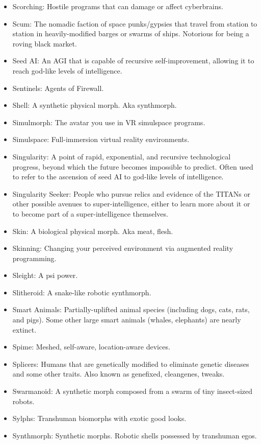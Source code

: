\begin{itemize}
\item Scorching: Hostile programs that can damage or affect  cyberbrains.
\item Scum: The nomadic faction of space punks/gypsies that travel  from station to station in heavily-modified barges or swarms of  ships. Notorious for being a roving black market.
\item Seed AI: An AGI that is capable of recursive self-improvement,  allowing it to reach god-like levels of intelligence.
\item Sentinels: Agents of Firewall.
\item Shell: A synthetic physical morph. Aka synthmorph.
\item Simulmorph: The avatar you use in VR simulspace programs.
\item Simulspace: Full-immersion virtual reality environments.
\item Singularity: A point of rapid, exponential, and recursive  technological progress, beyond which the future becomes impossible  to predict. Often used to refer to the ascension of seed AI to  god-like levels of intelligence.
\item Singularity Seeker: People who pursue relics and evidence of the  TITANs or other possible avenues to super-intelligence, either to  learn more about it or to become part of a super-intelligence  themselves.
\item Skin: A biological physical morph. Aka meat, flesh.
\item Skinning: Changing your perceived environment via augmented  reality programming.
\item Sleight: A psi power.
\item Slitheroid: A snake-like robotic synthmorph.
\item Smart Animals: Partially-uplifted animal species (including  dogs, cats, rats, and pigs). Some other large smart animals (whales,  elephants) are nearly extinct.
\item Spime: Meshed, self-aware, location-aware devices.
\item Splicers: Humans that are genetically modified to eliminate  genetic diseases and some other traits. Also known as genefixed,  cleangenes, tweaks.
\item Swarmanoid: A synthetic morph composed from a swarm of tiny  insect-sized robots.
\item Sylphs: Transhuman biomorphs with exotic good looks.
\item Synthmorph: Synthetic morphs. Robotic shells possessed by  transhuman egos.

\end{itemize}
